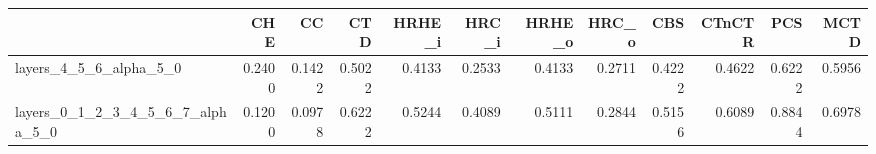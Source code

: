 \begin{tabular}{lrrrrrrrrrrr}
\toprule
 & CHE & CC & CTD & HRHE_i & HRC_i & HRHE_o & HRC_o & CBS & CTnCTR & PCS & MCTD \\
\midrule
layers_4_5_6_alpha_5_0 & 0.2400 & 0.1422 & 0.5022 & 0.4133 & 0.2533 & 0.4133 & 0.2711 & 0.4222 & 0.4622 & 0.6222 & 0.5956 \\
layers_0_1_2_3_4_5_6_7_alpha_5_0 & 0.1200 & 0.0978 & 0.6222 & 0.5244 & 0.4089 & 0.5111 & 0.2844 & 0.5156 & 0.6089 & 0.8844 & 0.6978 \\
\bottomrule
\end{tabular}
